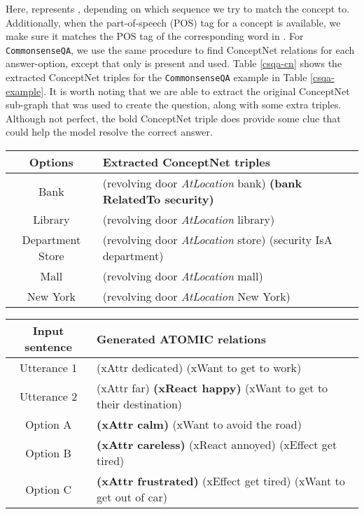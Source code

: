 \documentclass[11pt,a4paper]{article}
\begin{document}
Here,  represents , depending on which sequence we try to match the concept  to. Additionally, when the part-of-speech (POS) tag for a concept is available, we make sure it matches the POS tag of the corresponding word in . For \texttt{CommonsenseQA}, we use the same procedure to find ConceptNet relations for each answer-option, except that only  is present and used. Table \ref{csqa-cn} shows the extracted ConceptNet triples for the \texttt{CommonsenseQA} example in Table \ref{csqa-example}. It is worth noting that we are able to extract the original ConceptNet sub-graph that was used to create the question, along with some extra triples. Although not perfect, the bold ConceptNet triple does provide some clue that could help the model resolve the correct answer.


\begin{table*}[h]
\footnotesize
\begin{center}
\begin{tabular}{|c|l|}
\hline 
\bf Options & \bf Extracted ConceptNet triples \\
\hline
Bank & (revolving door \textit{AtLocation} bank) \bf (bank RelatedTo security) \\
Library & (revolving door \textit{AtLocation} library) \\
Department Store & (revolving door \textit{AtLocation} store) (security IsA department) \\
Mall & (revolving door \textit{AtLocation} mall) \\
New York & (revolving door \textit{AtLocation} New York) \\
\hline
\end{tabular}
\end{center}
\caption{Extracted ConceptNet relations for sample shown in Table \ref{csqa-example}.}
\label{csqa-cn}
\end{table*}

\begin{table*}[h]
\footnotesize
\begin{center}
\begin{tabular}{|c|l|}
\hline 
\bf Input sentence & \bf Generated ATOMIC relations \\
\hline
Utterance 1 & (xAttr dedicated) (xWant to get to work) \\
Utterance 2 & (xAttr far) \textbf{(xReact happy)} (xWant to get to their destination) \\
Option A & \textbf{(xAttr calm)} (xWant to avoid the road)  \\
Option B & \textbf{(xAttr careless)} (xReact annoyed) (xEffect get tired) \\
Option C & \textbf{(xAttr frustrated)} (xEffect get tired) (xWant to get out of car) \\
\hline
\end{tabular}
\end{center}
\caption{Sample generated ATOMIC relations for sample shown in Table \ref{dream-example}.}
\label{dream-at}
\end{table*}
\end{document}

